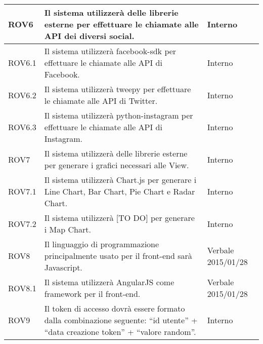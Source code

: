 \begin{center}
\begin{longtable}{| p{2.5cm} | p{8cm} | p{2cm} |}
		ROV6  &  Il sistema utilizzerà delle librerie esterne per effettuare le chiamate alle API dei diversi social.  &  Interno \\
		\hline
		ROV6.1  &  Il sistema utilizzerà facebook-sdk per effettuare le chiamate alle API di Facebook.  &  Interno \\
		\hline
		ROV6.2  &  Il sistema utilizzerà tweepy per effettuare le chiamate alle API di Twitter.  &  Interno \\
		\hline
		ROV6.3  &  Il sistema utilizzerà python-instagram per effettuare le chiamate alle API di Instagram.  &  Interno \\
		\hline

		ROV7  &  Il sistema utilizzerà delle librerie esterne per generare i grafici necessari alle View.  &  Interno \\
		\hline
		ROV7.1  &  Il sistema utilizzerà Chart.js per generare i Line Chart, Bar Chart, Pie Chart e Radar Chart.  &  Interno \\
		\hline
		ROV7.2  &  Il sistema utilizzerà [TO DO] per generare i Map Chart.  &  Interno \\
		\hline

		ROV8  &  Il linguaggio di programmazione principalmente usato per il front-end sarà Javascript.  &  Verbale 2015/01/28 \\
		\hline
		ROV8.1  &  Il sistema utilizzerà AngularJS come framework per il front-end.  &  Verbale 2015/01/28 \\
		\hline


		ROV9  &  Il token di accesso dovrà essere formato dalla combinazione seguente: ``id utente'' + ``data creazione token'' + ``valore random''.  &  Interno \\
		\hline

	\end{longtable}
	\egroup
\end{center}
